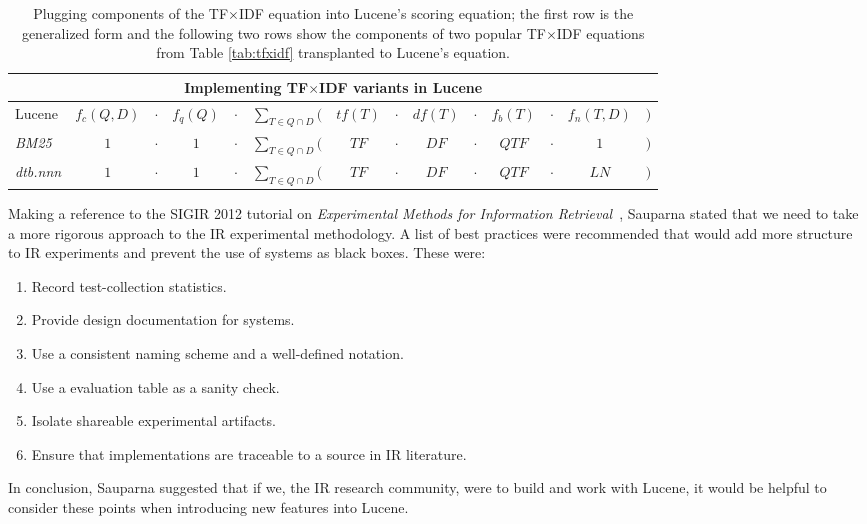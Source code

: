 \begin{table}[bht!]
  \centering
  \small
  \begin{minipage}[t]{0.94\textwidth}

    \begin{tabular}{lccccccccccccc}
      \multicolumn{14}{c}{Implementing TF$\times$IDF variants in Lucene}
      \\
      \hline\hline

      Lucene    & $f_{c}(Q,D)$ & $\cdot$  & $f_{q}(Q)$
      & $\cdot$ & $\displaystyle\sum_{T \in Q \cap D}($  & $tf(T)$
      & $\cdot$ & $df(T)$  & $\cdot$  & $f_{b}(T)$
      & $\cdot$ & $f_{n}(T,D)$   & $)$ \\
      
      \emph{BM25}      & $1$          &  $\cdot$ & $1$
      & $\cdot$ & $\displaystyle\sum_{T \in Q \cap D}($  & $TF$
      & $\cdot$ & $DF$          & $\cdot$  & $QTF$
      & $\cdot$ & $1$          & $)$ \\

      \emph{dtb.nnn}   & $1$          & $\cdot$  & $1$
      & $\cdot$ & $\displaystyle\sum_{T \in Q \cap D}($  & $TF$
      & $\cdot$ & $DF$          & $\cdot$  & $QTF$
      & $\cdot$ & $LN$          & $)$ \\

      \hline\hline
    \end{tabular}

    \caption{\small Plugging components of the TF$\times$IDF equation
      into Lucene's scoring equation; the first row is the generalized
      form and the following two rows show the components of two
      popular TF$\times$IDF equations from Table \ref{tab:tfxidf}
      transplanted to Lucene's equation.}

    \label{tab:lucene}

  \end{minipage}
\end{table}

Making a reference to the SIGIR 2012 tutorial on \emph{Experimental
  Methods for Information
  Retrieval}~\cite{Metzler:2012:EMI:2348283.2348534}, Sauparna stated
that we need to take a more rigorous approach to the IR experimental
methodology. A list of best practices were recommended that would add
more structure to IR experiments and prevent the use of systems as
black boxes. These were:

\begin{enumerate}
\item Record test-collection statistics.
\item Provide design documentation for systems.
\item Use a consistent naming scheme and a well-defined notation.
\item Use a evaluation table as a sanity check.
\item Isolate shareable experimental artifacts.
\item Ensure that implementations are traceable to a source in IR
  literature.
\end{enumerate}

In conclusion, Sauparna suggested that if we, the IR research
community, were to build and work with Lucene, it would be helpful to
consider these points when introducing new features into Lucene.
